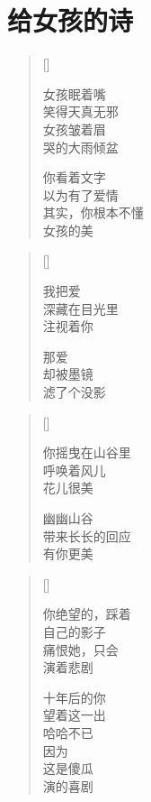 \chapter{给女孩的诗}
\thispagestyle{empty}
\renewcommand{\poemtoc}{section}
\settowidth{\versewidth}{女孩眠着嘴}
\begin{verse}[\versewidth]

女孩眠着嘴\\
笑得天真无邪\\
女孩皱着眉\\
哭的大雨倾盆

你看着文字\\
以为有了爱情\\
其实，你根本不懂\\
女孩的美
\end{verse}

\settowidth{\versewidth}{女孩眠着嘴}
\begin{verse}[\versewidth]

我把爱\\
深藏在目光里\\
注视着你

那爱\\
却被墨镜\\
滤了个没影
\end{verse}

\settowidth{\versewidth}{女孩眠着嘴}
\begin{verse}[\versewidth]

你摇曳在山谷里\\
呼唤着风儿\\
花儿很美

幽幽山谷\\
带来长长的回应\\
有你更美
\end{verse}
\newpage

\settowidth{\versewidth}{你绝望的，踩着}
\begin{verse}[\versewidth]

你绝望的，踩着\\
自己的影子\\
痛恨她，只会\\
演着悲剧

十年后的你\\
望着这一出\\
哈哈不已\\
因为\\
这是傻瓜\\
演的喜剧
\end{verse}

